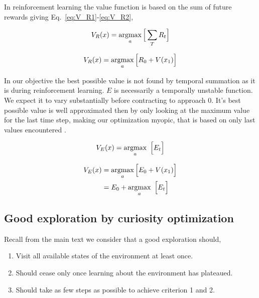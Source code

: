 In reinforcement learning the value function is based on the sum of future rewards giving Eq.~\ref{eq:V_R1}-\ref{eq:V_R2},

\begin{equation}
	\label{eq:V_R1}
	V_R(x) = \operatorname*{argmax}_a \Big [ \sum_T R_t \Big ]
\end{equation}

\begin{equation}
	\label{eq:V_R2}
	V_R(x) = \operatorname*{argmax}_a \Big [ R_0 + V(x_1) \Big ] \\
\end{equation}

In our objective the best possible value is not found by temporal summation as it is during reinforcement learning. $E$ is necessarily a temporally unstable function. We expect it to vary substantially before contracting to approach 0. It's best possible value is well approximated then by only looking at the maximum value for the last time step, making our optimization myopic, that is based on only last values encountered \cite{Hocker2019}.

\begin{equation}
	\label{eq:V_E1} 
	V_E(x) = \operatorname*{argmax}_a \ \Big [ E_t \Big ]
\end{equation}

\begin{equation}
	\label{eq:V_E2} 
	\begin{split}
	V_E(x) &= \operatorname*{argmax}_a \Big [ E_0 + V(x_1) \Big ] \\
		   &= E_0 + \operatorname*{argmax}_a \ \Big [ E_t \Big ] \\
	\end{split}
\end{equation}

\subsection*{Good exploration by curiosity optimization} 

Recall from the main text we consider that a good exploration should,

\begin{enumerate}
  \item Visit all available states of the environment at least once. 
  \item Should cease only once learning about the environment has plateaued. 
  \item Should take as few steps as possible to achieve criterion 1 and 2.
\end{enumerate}

